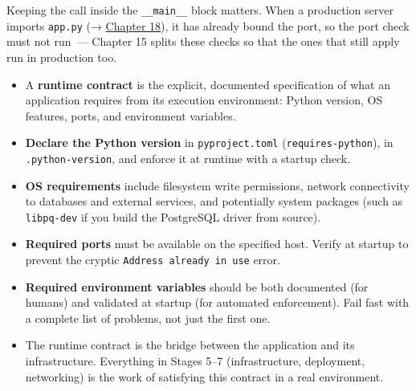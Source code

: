 \noindent{}Keeping the call inside the \texttt{\_\_main\_\_} block matters. When a production server imports \texttt{app.py} (→ \hyperref[ch:18-containerization]{Chapter 18}), it has already bound the port, so the port check must not run~--- Chapter 15 splits these checks so that the ones that still apply run in production too.

\label{14-runtime-contract:key-takeaways}
\begin{takeaways}

\begin{itemize}
\tightlist
\item
  A \textbf{runtime contract} is the explicit, documented specification of what an application requires from its execution environment: Python version, OS features, ports, and environment variables.
\item
  \textbf{Declare the Python version} in \texttt{pyproject.toml} (\texttt{requires-python}), in \texttt{.python-version}, and enforce it at runtime with a startup check.
\item
  \textbf{OS requirements} include filesystem write permissions, network connectivity to databases and external services, and potentially system packages (such as \texttt{libpq-dev} if you build the PostgreSQL driver from source).
\item
  \textbf{Required ports} must be available on the specified host. Verify at startup to prevent the cryptic \texttt{Address\ already\ in\ use} error.
\item
  \textbf{Required environment variables} should be both documented (for humans) and validated at startup (for automated enforcement). Fail fast with a complete list of problems, not just the first one.
\item
  The runtime contract is the bridge between the application and its infrastructure. Everything in Stages 5--7 (infrastructure, deployment, networking) is the work of satisfying this contract in a real environment.
\end{itemize}

\end{takeaways}

\label{14-runtime-contract:exercises}

